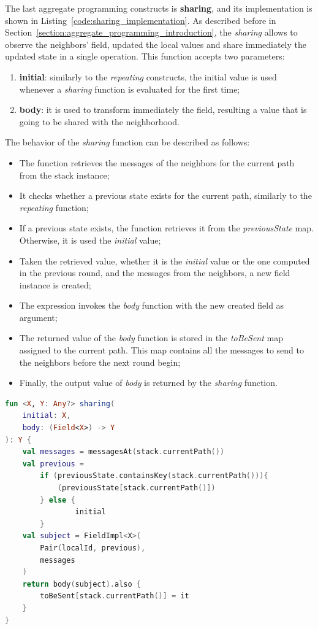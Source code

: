The last aggregate programming constructs is \textbf{sharing}, and its implementation is shown in Listing~\ref{code:sharing_implementation}. As described before in Section~\ref{section:aggregate_programming_introduction}, the \textit{sharing} allows to observe the
neighbors' field, updated the local values and share immediately the updated state in a
single operation.\newline
This function accepts two parameters:
\begin{enumerate}
    \item \textbf{initial}: similarly to the \textit{repeating} constructs, the initial value is used whenever a \textit{sharing} function is evaluated for the first time;
    \item \textbf{body}: it is used to transform immediately the field, resulting a value that is going to be shared with the neighborhood.
\end{enumerate}
The behavior of the \textit{sharing} function can be described as follows:
\begin{itemize}
    \item The function retrieves the messages of the neighbors for the current path from the stack instance;
    \item It checks whether a previous state exists for the current path, similarly to the \textit{repeating} function;
    \item If a previous state exists, the function retrieves it from the \textit{previousState} map. Otherwise, it is used the \textit{initial} value;
    \item Taken the retrieved value, whether it is the \textit{initial} value or the one computed in the previous round, and the messages from the neighbors, a new field instance is created;
    \item The expression invokes the \textit{body} function with the new created field as argument;
    \item The returned value of the \textit{body} function is stored in the \textit{toBeSent} map assigned to the current path. This map contains all the messages to send to the neighbors before the next round begin;
    \item Finally, the output value of \textit{body} is returned by the \textit{sharing} function.
\end{itemize}
\begin{lstlisting}[caption={Sharing implementation}, captionpos=b, language=Kotlin, label={code:sharing_implementation}]
fun <X, Y: Any?> sharing(
    initial: X,
    body: (Field<X>) -> Y
): Y {
    val messages = messagesAt(stack.currentPath())
    val previous = 
        if (previousState.containsKey(stack.currentPath())){
            (previousState[stack.currentPath()]) 
        } else {
                initial
        }
    val subject = FieldImpl<X>(
        Pair(localId, previous), 
        messages
    )
    return body(subject).also {
        toBeSent[stack.currentPath()] = it
    }
}
\end{lstlisting}

